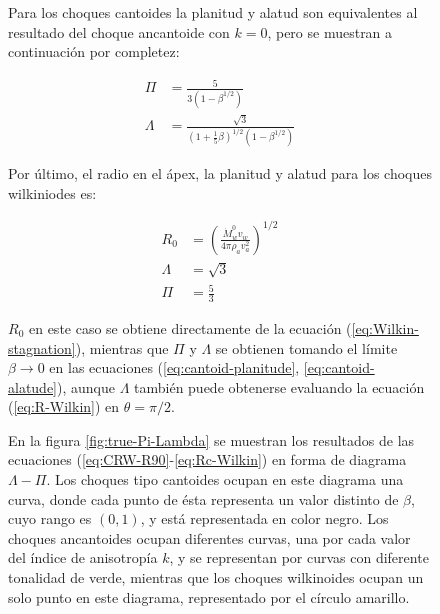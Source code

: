 \begin{figure}
Para los choques cantoides la planitud y alatud son equivalentes al resultado del choque ancantoide con $k=0$, pero se muestran a continuación por completez:

\begin{align}
  \Pi &= \frac{5}{3\left(1-\beta^{1/2}\right)}\label{eq:cantoid-planitude}\\
  \Lambda &= \frac{\sqrt{3}}{\left(1 + \frac{1}{5}\beta\right)^{1/2}\left(1 - \beta^{1/2}\right)} \label{eq:cantoid-alatude}
\end{align}

Por último, el radio en el ápex, la planitud y alatud para los choques wilkiniodes es:

\begin{align}
   R_0 &= \left(\frac{\dot{M}^0_w v_w}{4\pi \rho_a v^2_a}\right)^{1/2} \\
  \Lambda &= \sqrt{3} \label{eq:R90-Wilkin} \\
  \Pi &= \frac{5}{3} \label{eq:Rc-Wilkin}
\end{align}

$R_0$ en este caso se obtiene directamente de la ecuación (\ref{eq:Wilkin-stagnation}), mientras que $\Pi$ y $\Lambda$ se obtienen tomando el límite $\beta\to 0$ en las ecuaciones (\ref{eq:cantoid-planitude}, \ref{eq:cantoid-alatude}), aunque $\Lambda$ también puede obtenerse evaluando la ecuación (\ref{eq:R-Wilkin}) en $\theta=\pi/2$.

En la figura \ref{fig:true-Pi-Lambda} se muestran los resultados de las ecuaciones (\ref{eq:CRW-R90}-\ref{eq:Rc-Wilkin}) en forma de diagrama $\Lambda-\Pi$. Los choques tipo cantoides ocupan en este diagrama una curva, donde cada punto de ésta representa un valor distinto de $\beta$, cuyo rango es $(0, 1)$, y está representada en color negro. Los choques ancantoides ocupan diferentes curvas, una por cada valor del índice de anisotropía $k$, y se representan por curvas con diferente tonalidad de verde, mientras que los choques wilkinoides ocupan un solo punto en este diagrama, representado por el círculo amarillo.


\end{figure}
